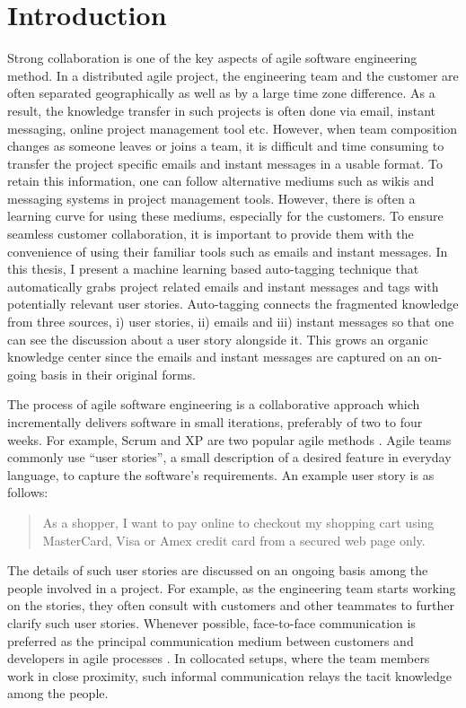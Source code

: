 \fancyhead[RO,LE]{\thepage}
\fancyfoot{} 
\chapter{Introduction}
Strong collaboration is one of the key aspects of agile software engineering method. In a distributed agile project, the engineering team and the customer are often separated geographically as well as by a large time zone difference. As a result, the knowledge transfer in such projects is often  done via email, instant messaging, online project management tool etc. However, when team composition changes as someone leaves or joins a team, it is difficult and time consuming to transfer the project specific emails and instant messages in a usable format. To retain this information, one can follow alternative mediums such as wikis and messaging systems in project management tools. However, there is often a learning curve for using these mediums, especially for the customers. To ensure seamless customer collaboration, it is important to provide them with the convenience of using their familiar tools such as emails and instant messages. In this thesis, I present a machine learning based auto-tagging technique that automatically grabs project related emails and instant messages and tags with potentially relevant user stories. Auto-tagging connects the fragmented knowledge from three sources, i) user stories, ii) emails and iii) instant messages so that one can see the discussion about a user story alongside it. This grows an organic knowledge center since the emails and instant messages are captured on an on-going basis in their original forms.

The process of agile software engineering is a collaborative approach which incrementally delivers software in small iterations, preferably of two to four weeks. For example, Scrum and XP are two popular agile methods \cite{scrum, xp}. Agile teams commonly use ``user stories'', a small description of a desired feature in everyday language, to capture the software's requirements. An example user story is as follows:\\
\begin{quote}
As a shopper, I want to pay online to checkout my shopping cart using MasterCard, Visa or Amex credit card from a secured web page only.
\end{quote}
The details of such user stories are discussed on an ongoing basis among the people involved in a project. For example, as the engineering team starts working on the stories, they often consult with customers and other teammates to further clarify such user stories. Whenever possible, face-to-face communication is preferred as the principal communication medium between customers and developers in agile processes \cite{am, xp, scrum, xp_up}. In collocated setups, where the team members work in close proximity, such informal communication relays the tacit knowledge among the people. 

